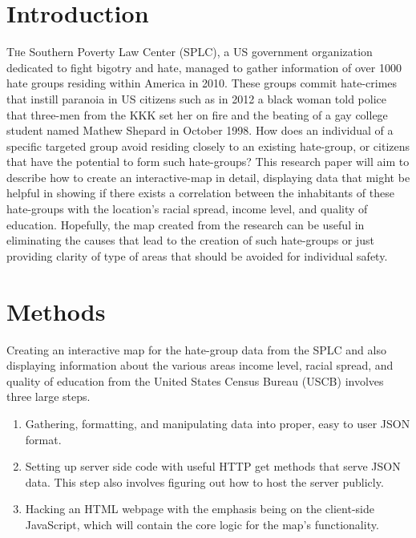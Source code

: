 \documentclass[twoside]{article}
\begin{document}
\begin{multicols}{2} %

\section{Introduction}

\lettrine[nindent=0em,lines=3]{T}he Southern Poverty Law Center (SPLC), a US government organization dedicated to fight bigotry and hate, managed to gather information of over 1000 hate groups residing within America in 2010. These groups commit hate-crimes that instill paranoia in US citizens such as in 2012 a black woman told police that three-men from the KKK set her on fire and the beating of a gay college student named Mathew Shepard in October 1998. How does an individual of a specific targeted group avoid residing closely to an existing hate-group, or citizens that have the potential to form such hate-groups? This research paper will aim to describe how to create an interactive-map in detail, displaying data that might be helpful in showing if there exists a correlation between the inhabitants of these hate-groups with the location's racial spread, income level, and quality of education. Hopefully, the map created from the research can be useful in eliminating the causes that lead to the creation of such hate-groups or just providing clarity of type of areas that should be avoided for individual safety.


\section{Methods}

Creating an interactive map for the hate-group data from the SPLC and also displaying information about the various areas income level, racial spread, and quality of education from the United States Census Bureau (USCB) involves three large steps. 

\begin{enumerate}
  \item Gathering, formatting, and manipulating data into proper, easy to user JSON format.
  \item Setting up server side code with useful HTTP get methods that serve JSON data. This step also involves figuring out how to host the server publicly.
  \item Hacking an HTML webpage with the emphasis being on the client-side JavaScript, which will contain the core logic for the map's functionality. 
\end{enumerate}



\end{multicols}
\end{document}
